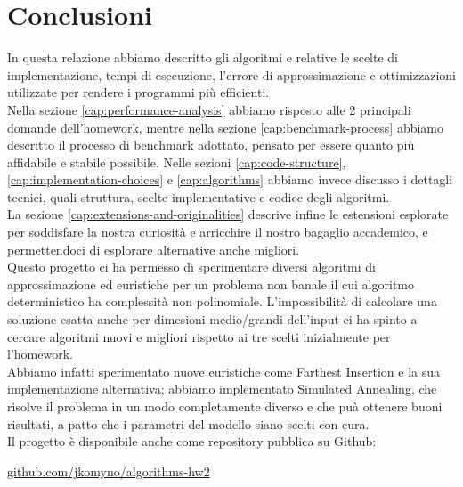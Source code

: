 \section{Conclusioni}
\label{cap:conclusions}

In questa relazione abbiamo descritto gli algoritmi e relative le
scelte di implementazione, tempi di esecuzione, l'errore di
approssimazione e ottimizzazioni utilizzate per rendere i programmi
più efficienti. \\

\noindent Nella sezione \ref{cap:performance-analysis} abbiamo
risposto alle 2 principali domande dell'homework, mentre nella sezione
\ref{cap:benchmark-process} abbiamo descritto il processo di benchmark
adottato, pensato per essere quanto più affidabile e stabile
possibile.  Nelle sezioni \ref{cap:code-structure},
\ref{cap:implementation-choices} e \ref{cap:algorithms} abbiamo invece
discusso i dettagli tecnici, quali struttura, scelte implementative e
codice degli algoritmi. \\

\noindent La sezione \ref{cap:extensions-and-originalities} descrive
infine le estensioni esplorate per soddisfare la nostra curiosità e
arricchire il nostro bagaglio accademico, e permettendoci di esplorare
alternative anche migliori. \\

\noindent Questo progetto ci ha permesso di sperimentare diversi
algoritmi di approssimazione ed euristiche per un problema non banale
il cui algoritmo deterministico ha complessità non
polinomiale. L'impossibilità di calcolare una soluzione esatta anche
per dimesioni medio/grandi dell'input ci ha spinto a cercare algoritmi
nuovi e migliori rispetto ai tre scelti inizialmente per
l'homework. \\

\noindent Abbiamo infatti sperimentato nuove euristiche come
Farthest Insertion e la sua implementazione alternativa; abbiamo implementato Simulated Annealing,
che risolve il problema in un modo completamente diverso e che puà ottenere buoni risultati, a patto che i parametri del modello siano scelti con cura.\\

\noindent Il progetto è disponibile anche come repository pubblica su Github:

\begin{center}
\href{https://github.com/jkomyno/algorithms-hw2}{github.com/jkomyno/algorithms-hw2}
\end{center}

